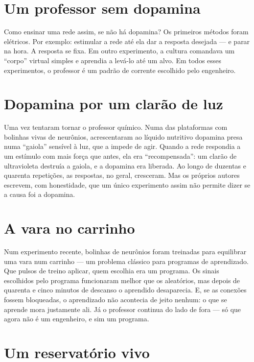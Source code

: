 \section*{Um professor sem dopamina}

Como ensinar uma rede assim, se não há dopamina? Os primeiros métodos foram elétricos. Por exemplo: estimular a rede até ela dar a resposta desejada --- e parar na hora. A resposta se fixa. Em outro experimento, a cultura comandava um ``corpo'' virtual simples e aprendia a levá-lo até um alvo. Em todos esses experimentos, o professor é um padrão de corrente escolhido pelo engenheiro.

\section*{Dopamina por um clarão de luz}

Uma vez tentaram tornar o professor químico. Numa das plataformas com bolinhas vivas de neurônios, acrescentaram ao líquido nutritivo dopamina presa numa ``gaiola'' sensível à luz, que a impede de agir. Quando a rede respondia a um estímulo com mais força que antes, ela era ``recompensada'': um clarão de ultravioleta destruía a gaiola, e a dopamina era liberada. Ao longo de duzentas e quarenta repetições, as respostas, no geral, cresceram. Mas os próprios autores escrevem, com honestidade, que um único experimento assim não permite dizer se a causa foi a dopamina.

\section*{A vara no carrinho}

Num experimento recente, bolinhas de neurônios foram treinadas para equilibrar uma vara num carrinho --- um problema clássico para programas de aprendizado. Que pulsos de treino aplicar, quem escolhia era um programa. Os sinais escolhidos pelo programa funcionaram melhor que os aleatórios, mas depois de quarenta e cinco minutos de descanso o aprendido desaparecia. E, se as conexões  fossem bloqueadas, o aprendizado não acontecia de jeito nenhum: o que se aprende mora justamente ali. Já o professor continua do lado de fora --- só que agora não é um engenheiro, e sim um programa.

\section*{Um reservatório vivo}


